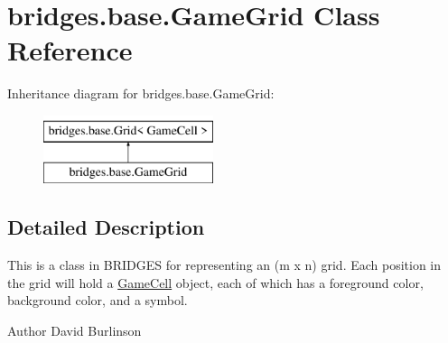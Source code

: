 \hypertarget{classbridges_1_1base_1_1_game_grid}{}\section{bridges.\+base.\+Game\+Grid Class Reference}
\label{classbridges_1_1base_1_1_game_grid}
Inheritance diagram for bridges.\+base.\+Game\+Grid\+:\begin{figure}[H]
\begin{center}
\leavevmode
\includegraphics[height=2.000000cm]{classbridges_1_1base_1_1_game_grid}
\end{center}
\end{figure}


\subsection{Detailed Description}
This is a class in B\+R\+I\+D\+G\+ES for representing an (m x n) grid. Each position in the grid will hold a \mbox{\hyperlink{classbridges_1_1base_1_1_game_cell}{Game\+Cell}} object, each of which has a foreground color, background color, and a symbol. 

\begin{DoxyAuthor}{Author}
David Burlinson 
\end{DoxyAuthor}
